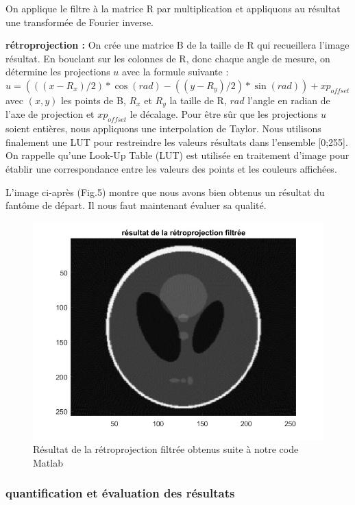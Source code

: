 \documentclass[conference]{IEEEtran}
\begin{document}
On applique le filtre à la matrice R par multiplication et appliquons au résultat une transformée de Fourier inverse.

\textbf{rétroprojection :} On crée une matrice B de la taille de R qui recueillera l'image résultat. En bouclant sur les colonnes de R, donc chaque angle de mesure, on détermine les projections $u$ avec la formule suivante :
$u=(((x-R_x)/2)*\cos(rad)-((y-R_y)/2)*\sin(rad))+xp_{offset}$
avec $(x,y)$ les points de B, $R_x$ et $R_y$ la taille de R, $rad$ l'angle en radian de l'axe de projection et $xp_{offset}$ le décalage.
Pour être sûr que les projections $u$ soient entières, nous appliquons une interpolation de Taylor.
Nous utilisons finalement une LUT pour restreindre les valeurs résultats dans l'ensemble [0;255].
On rappelle qu'une Look-Up Table (LUT) est utilisée en traitement d'image pour établir une correspondance entre les valeurs des points et les couleurs affichées.

L'image ci-après (Fig.5) montre que nous avons bien obtenus un résultat du fantôme de départ. Il nous faut maintenant évaluer sa qualité.

\begin{figure}[H]
\centering
\includegraphics[scale=0.5]{rsultat-de-la-rtroprojetion-filtre}
	\caption[Résultat de la rétroprojection filtrée obtenus suite à notre code Matlab]{Résultat de la rétroprojection filtrée obtenus suite à notre code Matlab}
\label{fig:gallery}
\end{figure}

\subsubsection{quantification et évaluation des résultats}
\end{document}
